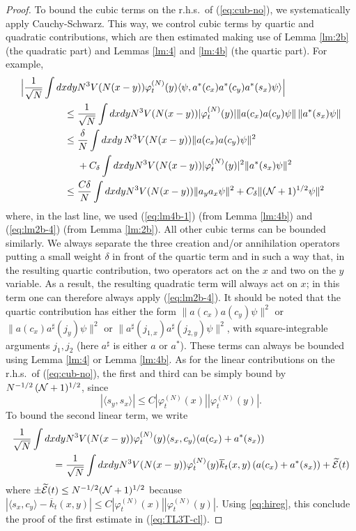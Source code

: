 \documentclass[11pt,a4paper]{article}
\newcommand{\wt}{\widetilde}
\newcommand{\cE}{{\cal E}}
\newcommand{\cN}{{\cal N}}
\begin{document}
\begin{proof}
To bound the cubic terms on the r.h.s.\ of (\ref{eq:cub-no}), we systematically apply Cauchy-Schwarz.
This way, we control cubic terms by quartic and quadratic contributions, which are then estimated making use of Lemma \ref{lm:2b} (the quadratic part) and Lemmas \ref{lm:4} and \ref{lm:4b} (the quartic part). For example,
\[ \begin{split} \Big| \frac{1}{\sqrt{N}}\int dx dy &N^3 V(N(x-y)) \varphi_t^{(N)} (y) \langle  \psi , a^* (c_x) a^* (c_y) a^* (s_x) \psi \rangle \Big| \\ \leq \; &  \frac{1}{\sqrt{N}} \int dx dy N^3 V (N (x-y)) |\varphi_t^{(N)} (y)|  \| a (c_x) a (c_y) \psi \| \, \| a^* (s_x) \psi \| \\ \leq \; & \frac{\delta}{N}  \int dx dy \, N^3 V (N (x-y)) \| a (c_x) a(c_y) \psi \|^2 \\ &+ C_\delta\int dx dy N^3 V (N (x-y)) |\varphi_t^{(N)} (y)|^2 \| a^* (s_x)  \psi \|^2 \\ \leq \; & \frac{C \delta}{N} \int dx dy N^3 V(N (x-y)) \| a_y a_x \psi \|^2 + C_\delta  \| (\cN + 1)^{1/2}  \psi \|^2  \end{split} \]
where, in the last line, we used (\ref{eq:lm4b-1}) (from Lemma \ref{lm:4b}) and (\ref{eq:lm2b-4}) (from Lemma \ref{lm:2b}). All other cubic terms can be bounded similarly. We always separate the three creation and/or annihilation operators putting a small weight $\delta$ in front of the quartic term and
in such a way that, in the resulting quartic contribution, two operators act on the $x$ and two on the $y$ variable. As a result, the resulting quadratic term will always act on $x$; in this term one can therefore always apply (\ref{eq:lm2b-4}). It should be noted that the quartic contribution has either the form $\| a (c_x) a (c_y) \psi \|^2$ or $\| a (c_x) a^\sharp (j_y) \psi \|^2$ or $\| a^\sharp (j_{1,x}) a^\sharp (j_{2,y}) \psi \|^2$, with square-integrable arguments $j_1, j_2$ (here $a^\sharp$ is either $a$ or $a^*$). These terms can always be bounded using Lemma \ref{lm:4} or Lemma \ref{lm:4b}. As for the linear contributions on the r.h.s.\ of (\ref{eq:cub-no}), the first and third can be simply bound by $N^{-1/2} \, (\cN+1)^{1/2}$, since 
\[ |\langle s_y , s_x \rangle| \leq C |\varphi^{(N)}_t (x)| |\varphi^{(N)}_t (y)|. \]
To bound the second linear term, we write 
\[ \begin{split} 
\frac{1}{\sqrt{N}} \int dx dy & N^3 V(N (x-y)) \varphi_t^{(N)} (y) \langle s_x, c_y \rangle (a(c_x) + a^* (s_x))  \\ = \; & \frac{1}{\sqrt{N}} \int dx dy  N^3 V(N (x-y)) \varphi_t^{(N)} (y) \overline{k}_t (x,y) \, (a(c_x) + a^* (s_x)) + \wt{\cE} (t) \end{split} \]
where $\pm \wt{\cE} (t) \leq N^{-1/2} (\cN+1)^{1/2}$ because $|\langle s_x , c_y \rangle - \overline{k}_t (x,y)| \leq C |\varphi_t^{(N)} (x)| |\varphi_t^{(N)} (y)|$. Using \eqref{eq:hireg}, this conclude the proof of the first estimate in (\ref{eq:TL3T-cl}). 


\end{proof}
\end{document}

